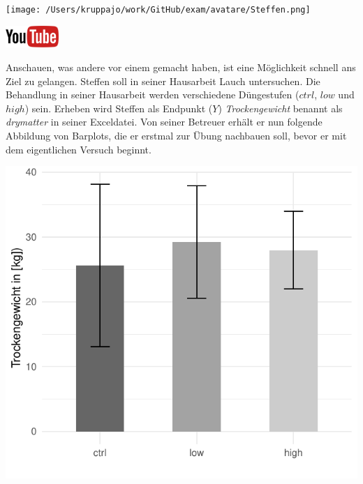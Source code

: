 \documentclass[a4paper, 9pt]{scrartcl}\usepackage[]{graphicx}\usepackage[]{xcolor}
\makeatletter
\def\maxwidth{ %
  \ifdim\Gin@nat@width>\linewidth
    \linewidth
  \else
    \Gin@nat@width
  \fi
}
\makeatother
\begin{document}
 
\begin{minipage}[t]{0.5\textwidth}
\texttt{[image: /Users/kruppajo/work/GitHub/exam/avatare/Steffen.png]}
\end{minipage}
\begin{minipage}[t]{0.5\textwidth}
\hfill
\href{https://youtu.be/t0WYa_LVc5o}{\includegraphics[width = 2cm]{img/youtube}}\\[1Ex]
\end{minipage}
\vspace{1ex}



Anschauen, was andere vor einem gemacht haben, ist eine Möglichkeit schnell ans Ziel zu gelangen. Steffen soll in seiner Hausarbeit Lauch untersuchen. Die Behandlung in seiner Hausarbeit werden verschiedene Düngestufen ($ctrl$, $low$ und $high$) sein. Erheben wird Steffen als Endpunkt ($Y$) \textit{Trockengewicht} benannt als \textit{drymatter} in seiner Exceldatei. Von seiner Betreuer erhält er nun folgende Abbildung von Barplots, die er erstmal zur Übung nachbauen soll, bevor er mit dem eigentlichen Versuch beginnt.



{\centering \includegraphics[width=\maxwidth]{img/barplot-02-1} 

}
\end{document}
